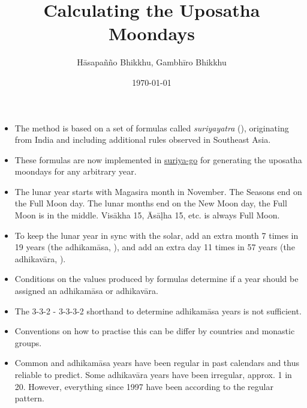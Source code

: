\documentclass[11pt,oneside]{memoir-article}
\author{Hāsapañño Bhikkhu, Gambhīro Bhikkhu}
\date{\today}
\title{Calculating the Uposatha Moondays}
\begin{document}
\maketitle
\begin{tldr}
\begin{itemize}
\item The method is based on a set of formulas called \emph{suriyayatra} (),
originating from India and including additional rules observed in Southeast
Asia.
\item These formulas are now implemented in \href{https://github.com/splendidmoons/suriya-go}{suriya-go} for generating the uposatha
moondays for any arbitrary year.
\item The lunar year starts with Magasira month in November. The Seasons end on the
Full Moon day. The lunar months end on the New Moon day, the Full Moon is in
the middle. Visākha 15, Āsāḷha 15, etc. is always Full Moon.
\item To keep the lunar year in sync with the solar, add an extra month 7 times in
19 years (the adhikamāsa, ), and add an extra day 11 times in 57
years (the adhikavāra, ).
\item Conditions on the values produced by formulas determine if a year should be
assigned an adhikamāsa or adhikavāra.
\item The 3-3-2 - 3-3-3-2 shorthand to determine adhikamāsa years is not sufficient.
\item Conventions on how to practise this can be differ by countries and monastic groups.
\item Common and adhikamāsa years have been regular in past calendars and thus
reliable to predict. Some adhikavāra years have been irregular, approx. 1
in 20. However, everything since 1997 have been according to the regular
pattern.
\end{itemize}
\end{tldr}

\thispagestyle{empty}

\savenotes


\spewnotes

\end{document}
